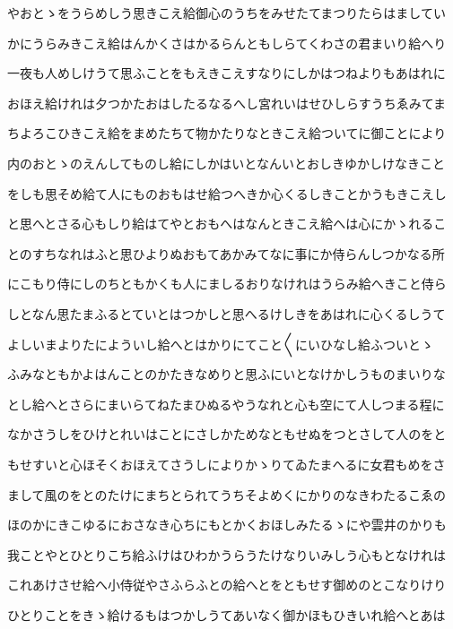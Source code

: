 \documentclass[a4paper,11pt,landscape]{ltjtarticle}
\begin{document}
\par\medskip
やおとゝをうらめしう思きこえ給御心のうちをみせたてまつりたらはましてい
\par\medskip
かにうらみきこえ給はんかくさはかるらんともしらてくわさの君まいり給へり
\par\medskip
一夜も人めしけうて思ふことをもえきこえすなりにしかはつねよりもあはれに
\par\medskip
おほえ給けれは夕つかたおはしたるなるへし宮れいはせひしらすうちゑみてま
\par\medskip
ちよろこひきこえ給をまめたちて物かたりなときこえ給ついてに御ことにより
\par\medskip
内のおとゝのえんしてものし給にしかはいとなんいとおしきゆかしけなきこと
\par\medskip
をしも思そめ給て人にものおもはせ給つへきか心くるしきことかうもきこえし
\par\medskip
と思へとさる心もしり給はてやとおもへはなんときこえ給へは心にかゝれるこ
\par\medskip
とのすちなれはふと思ひよりぬおもてあかみてなに事にか侍らんしつかなる所
\par\medskip
にこもり侍にしのちともかくも人にましるおりなけれはうらみ給へきこと侍ら
\par\medskip
しとなん思たまふるとていとはつかしと思へるけしきをあはれに心くるしうて
\par\medskip
よしいまよりたによういし給へとはかりにてこと〱にいひなし給ふついとゝ
\par\medskip
ふみなともかよはんことのかたきなめりと思ふにいとなけかしうものまいりな
\par\medskip
とし給へとさらにまいらてねたまひぬるやうなれと心も空にて人しつまる程に
\par\medskip
なかさうしをひけとれいはことにさしかためなともせぬをつとさして人のをと
\par\medskip
もせすいと心ほそくおほえてさうしによりかゝりてゐたまへるに女君もめをさ
\par\medskip
まして風のをとのたけにまちとられてうちそよめくにかりのなきわたるこゑの
\par\medskip
ほのかにきこゆるにおさなき心ちにもとかくおほしみたるゝにや雲井のかりも
\par\medskip
我ことやとひとりこち給ふけはひわかうらうたけなりいみしう心もとなけれは
\par\medskip
これあけさせ給へ小侍従やさふらふとの給へとをともせす御めのとこなりけり
\par\medskip
ひとりことをきゝ給けるもはつかしうてあいなく御かほもひきいれ給へとあは
\end{document}
